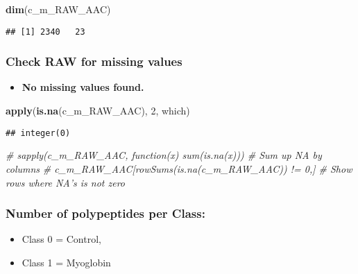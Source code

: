 \documentclass[]{article}
\newenvironment{Shaded}{\begin{snugshade}}{\end{snugshade}}
\newcommand{\CommentTok}[1]{\textcolor[rgb]{0.56,0.35,0.01}{\textit{#1}}}
\newcommand{\DecValTok}[1]{\textcolor[rgb]{0.00,0.00,0.81}{#1}}
\newcommand{\KeywordTok}[1]{\textcolor[rgb]{0.13,0.29,0.53}{\textbf{#1}}}
\newcommand{\NormalTok}[1]{#1}
\providecommand{\tightlist}{%
  \setlength{\itemsep}{0pt}\setlength{\parskip}{0pt}}
\begin{document}
\begin{Shaded}
\begin{Highlighting}[]
\KeywordTok{dim}\NormalTok{(c_m_RAW_AAC)}
\end{Highlighting}
\end{Shaded}

\begin{verbatim}
## [1] 2340   23
\end{verbatim}

\hypertarget{check-raw-for-missing-values}{%
\subsubsection{Check RAW for missing
values}\label{check-raw-for-missing-values}}

\begin{itemize}
\tightlist
\item
  \textbf{No missing values found.}
\end{itemize}

\begin{Shaded}
\begin{Highlighting}[]
\KeywordTok{apply}\NormalTok{(}\KeywordTok{is.na}\NormalTok{(c_m_RAW_AAC), }\DecValTok{2}\NormalTok{, which)}
\end{Highlighting}
\end{Shaded}

\begin{verbatim}
## integer(0)
\end{verbatim}

\begin{Shaded}
\begin{Highlighting}[]
\CommentTok{# sapply(c_m_RAW_AAC, function(x) sum(is.na(x))) # Sum up NA by columns}
\CommentTok{# c_m_RAW_AAC[rowSums(is.na(c_m_RAW_AAC)) != 0,] # Show rows where NA's is not zero}
\end{Highlighting}
\end{Shaded}

\hypertarget{number-of-polypeptides-per-class}{%
\subsubsection{Number of polypeptides per
Class:}\label{number-of-polypeptides-per-class}}

\begin{itemize}
\tightlist
\item
  Class 0 = Control,
\item
  Class 1 = Myoglobin
\end{itemize}
\end{document}
